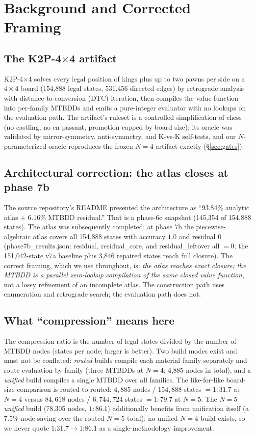 \documentclass[conference]{IEEEtran}
\begin{document}
\section{Background and Corrected Framing}
\label{sec:framing}

\subsection{The K2P-4$\times$4 artifact}
K2P-4$\times$4 \cite{k2p2025} solves every legal position of kings plus up
to two pawns per side on a $4\times4$ board (154{,}888 legal states,
531{,}456 directed edges) by retrograde analysis with distance-to-conversion
(DTC) iteration, then compiles the value function into per-family MTBDDs and
emits a pure-integer evaluator with no lookups on the evaluation path. The
artifact's ruleset is a controlled simplification of chess (no castling, no
en passant, promotion capped by board size); its oracle was validated by
mirror-symmetry, anti-symmetry, and K-vs-K self-tests, and our
$N$-parameterized oracle reproduces the frozen $N{=}4$ artifact exactly
(\S\ref{sec:gates}).

\subsection{Architectural correction: the atlas closes at phase 7b}
The source repository's README presented the architecture as ``93.84\%
analytic atlas + 6.16\% MTBDD residual.'' That is a phase-6c snapshot
(145{,}354 of 154{,}888 states). The atlas was subsequently completed: at
phase 7b the piecewise-algebraic atlas covers all 154{,}888 states with
accuracy $1.0$ and residual $0$ (phase7b\_results.json: residual,
residual\_core, and residual\_leftover all $=0$; the 151{,}042-state v7a
baseline plus 3{,}846 repaired states reach full closure). The correct
framing, which we use throughout, is: \emph{the atlas reaches exact closure;
the MTBDD is a parallel zero-lookup compilation of the same closed value
function}, not a lossy refinement of an incomplete atlas. The construction
path uses enumeration and retrograde search; the evaluation path does not.

\subsection{What ``compression'' means here}
The compression ratio is the number of legal states divided by the number of
MTBDD nodes (states per node; larger is better). Two build modes exist and
must not be conflated:
\emph{routed} builds compile each material family separately and route
evaluation by family (three MTBDDs at $N{=}4$; 4{,}885 nodes in total), and
a \emph{unified} build compiles a single MTBDD over all families. The
like-for-like board-size comparison is routed-to-routed:
$4{,}885$ nodes / $154{,}888$ states $=1{:}31.7$ at $N{=}4$ versus
$84{,}618$ nodes / $6{,}744{,}724$ states $=1{:}79.7$ at $N{=}5$. The
$N{=}5$ \emph{unified} build (78{,}305 nodes, $1{:}86.1$) additionally
benefits from unification itself (a $7.5\%$ node saving over the routed
$N{=}5$ total); no unified $N{=}4$ build exists, so we never quote
1:31.7$\to$1:86.1 as a single-methodology improvement.
\end{document}
